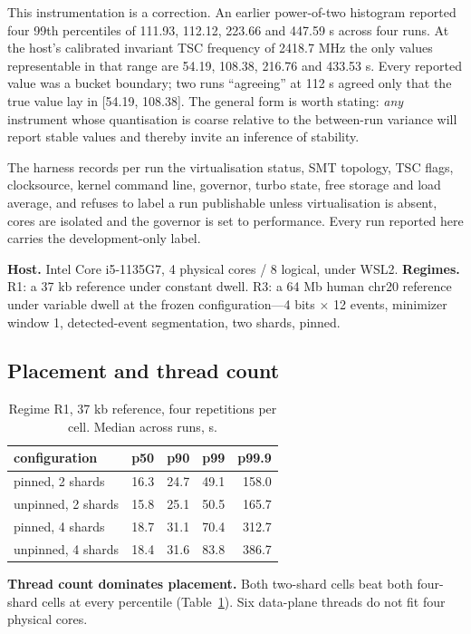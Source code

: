 \documentclass[sigconf,nonacm]{acmart}
\begin{document}
This instrumentation is a correction. An earlier power-of-two histogram reported four 99th
percentiles of 111.93, 112.12, 223.66 and 447.59 \textmu{}s across four runs. At the host's calibrated
invariant TSC frequency of 2418.7 MHz the only values representable in that range are 54.19,
108.38, 216.76 and 433.53 \textmu{}s. Every reported value was a bucket boundary; two runs ``agreeing''
at 112 \textmu{}s agreed only that the true value lay in [54.19, 108.38]. The general form is worth
stating: \emph{any} instrument whose quantisation is coarse relative to the between-run
variance will report stable values and thereby invite an inference of stability.

The harness records per run the virtualisation status, SMT topology, TSC flags, clocksource,
kernel command line, governor, turbo state, free storage and load average, and refuses to label
a run publishable unless virtualisation is absent, cores are isolated and the governor is set to
performance. Every run reported here carries the development-only label.

\textbf{Host.} Intel Core i5-1135G7, 4 physical cores / 8 logical, under WSL2.
\textbf{Regimes.} R1: a 37 kb reference under constant dwell. R3: a 64 Mb human chr20 reference
under variable dwell at the frozen configuration---4 bits $\times$ 12 events,
minimizer~\cite{minimizers} window
1, detected-event segmentation, two shards, pinned.

\subsection{Placement and thread count}

\begin{table}[t]
\caption{Regime R1, 37 kb reference, four repetitions per cell. Median across runs, \textmu{}s.}
\label{tab:r1}
\small
\begin{tabular}{lrrrr}
\toprule
configuration & p50 & p90 & p99 & p99.9 \\
\midrule
pinned, 2 shards   & 16.3 & 24.7 & 49.1 & 158.0 \\
unpinned, 2 shards & 15.8 & 25.1 & 50.5 & 165.7 \\
pinned, 4 shards   & 18.7 & 31.1 & 70.4 & 312.7 \\
unpinned, 4 shards & 18.4 & 31.6 & 83.8 & 386.7 \\
\bottomrule
\end{tabular}
\end{table}

\textbf{Thread count dominates placement.} Both two-shard cells beat both four-shard cells at
every percentile (Table~\ref{tab:r1}). Six data-plane threads do not fit four physical cores.
\end{document}
